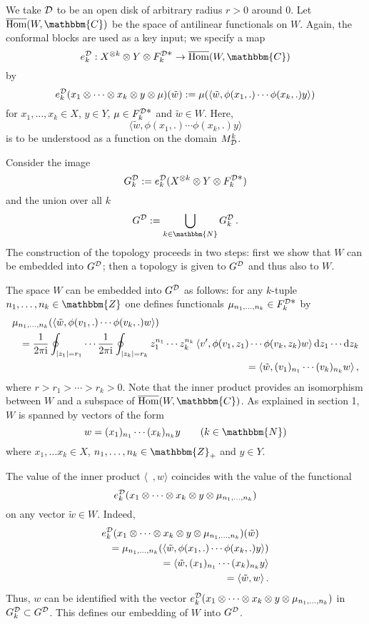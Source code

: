 \documentclass[a4paper,12pt,twoside]{article}
\renewcommand{\b}{\langle}
\renewcommand{\k}{\rangle}
\renewcommand{\i}{{\rm i}}
\renewcommand{\d}{{\rm d}}
\renewcommand{\c}[1]{{\cal #1}}
\newcommand{\bZ}{\mathbbm{Z}}
\newcommand{\bN}{\mathbbm{N}}
\newcommand{\bC}{\mathbbm{C}}
\newcommand{\D}{\c{D}}
\newcommand{\Fdd}{F^{\D{\textstyle *}}_k}
\newcommand{\Md}{M^k_{\D}}
\newcommand{\ed}{e_k^{\D}}
\newcommand{\Gdk}{G^{\D}_k}
\newcommand{\Gd}{G^{\D}}
\newcommand{\wt}{\tilde{w}}
\begin{document}
We take $\D$ to be an open disk of arbitrary radius $r>0$ around 0.
Let $\overline{\rm Hom}(W,\bC)$ be the space of antilinear functionals on $W$.
Again, the conformal blocks are used as a key input;
we specify a map
$$\ed: X^{\otimes k}\otimes Y\otimes\Fdd\to\overline{\rm Hom}(W,\bC)$$
by
\begin{equation}
\label{ek}
\ed(x_1\otimes\cdots\otimes x_k\otimes y\otimes\mu)(\wt) := \mu(\b\wt, \phi(x_1,.)\cdots \phi(x_k,.)y\k)
\end{equation}
for $x_1, \dots, x_k\in X$, $y\in Y$, $\mu\in\Fdd$ and $\wt\in W$.
Here, $$\b\wt,\phi(x_1,.)\cdots \phi(x_k,.)y\k$$
is to be understood as a function on the domain $\Md$.

Consider the image
$$\Gdk := \ed(X^{\otimes k}\otimes Y\otimes \Fdd)$$
and the union over all $k$
$$\Gd := \bigcup_{k\in\bN}\Gdk\,.$$
The construction of the topology proceeds in two steps:
first we show that $W$ can be embedded into
$\Gd$; then
a topology is given to $\Gd$ and thus also to $W$.

The space $W$ can be embedded into $\Gd$ as follows:
for any $k$-tuple $n_1,\ldots,n_k\in\bZ$ one
defines functionals $\mu_{n_1,\ldots,n_k}\in\Fdd$ by
\begin{eqnarray*}
\lefteqn{\mu_{n_1,\ldots,n_k}
(\b\wt,\phi(v_1,.)\cdots \phi(v_k,.)w\k)} \\ \nonumber
&&=
\frac{1}{2\pi\i}\oint_{|z_1|=r_1}\cdots
\frac{1}{2\pi\i}\oint_{|z_k|=r_k}z_1^{n_1}\cdots
z_k^{n_k}\,\b v',\phi(v_1,z_1)\cdots \phi(v_k,z_k)w\k\,
\d z_1\cdots\d z_k \\
&&=
\b\wt,(v_1)_{n_1}\cdots (v_k)_{n_k}w\k\,,
\end{eqnarray*}
where $r > r_1>\cdots >r_k > 0$.
Note that the inner product provides an isomorphism
between $W$ and a subspace of $\overline{\rm Hom}(W,\bC)$.
As explained in section 1, $W$ is spanned by vectors of the form
$$w = (x_1)_{n_1}\cdots (x_k)_{n_k} y\qquad (k\in\bN)$$
where $x_1,\ldots x_k\in X$, $n_1,\ldots, n_k\in\bZ_+$ and $y\in Y$.

The value of the inner product $\b\;\:, w\k$ coincides with the value of the
functional
$$\ed(x_1\otimes\cdots\otimes x_k\otimes y\otimes\mu_{n_1,\ldots,n_k})$$
on any vector $\tilde w \in W$. Indeed,
\begin{eqnarray*}
\lefteqn{
\ed(x_1\otimes\cdots\otimes x_k\otimes y\otimes\mu_{n_1,\ldots,n_k})(\wt)} \\
&&= \mu_{n_1,\ldots,n_k}(\b \wt, \phi(x_1,.)\cdots \phi(x_k,.)y\k) \\
&&= \b \wt,(x_1)_{n_1}\cdots (x_k)_{n_k}y\k \\
&&= \b \wt,w\k\,.
\end{eqnarray*}
Thus, $w$ can be identified with the vector $\ed(x_1\otimes\cdots\otimes x_k\otimes y\otimes\mu_{n_1,\ldots,n_k})$
in $\Gdk\subset \Gd$. This defines our embedding of $W$ into $\Gd$.
\end{document}
